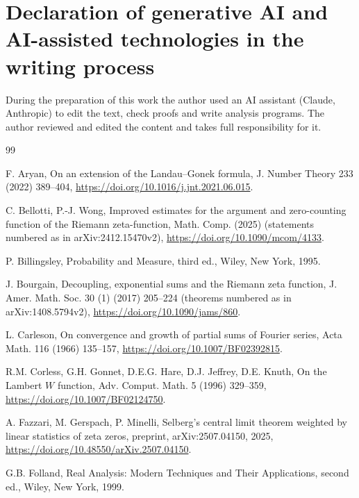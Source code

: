 \documentclass[preprint,12pt]{elsarticle}
\numberwithin{equation}{section}
\theoremstyle{plain}
\theoremstyle{definition}
\theoremstyle{remark}
\begin{document}
\section*{Declaration of generative AI and AI-assisted technologies in the writing process}
During the preparation of this work the author used an AI assistant (Claude, Anthropic) to edit the text, check proofs and write analysis programs. The author reviewed and edited the content and takes full responsibility for it.

\begin{thebibliography}{99}

F. Aryan, On an extension of the Landau--Gonek formula, J. Number Theory 233 (2022) 389--404, \href{https://doi.org/10.1016/j.jnt.2021.06.015}{https://doi.org/10.1016/j.jnt.2021.06.015}.

C. Bellotti, P.-J. Wong, Improved estimates for the argument and zero-counting function of the Riemann zeta-function, Math. Comp. (2025) (statements numbered as in arXiv:2412.15470v2), \href{https://doi.org/10.1090/mcom/4133}{https://doi.org/10.1090/mcom/4133}.

P. Billingsley, Probability and Measure, third ed., Wiley, New York, 1995.

J. Bourgain, Decoupling, exponential sums and the Riemann zeta function, J. Amer. Math. Soc. 30 (1) (2017) 205--224 (theorems numbered as in arXiv:1408.5794v2), \href{https://doi.org/10.1090/jams/860}{https://doi.org/10.1090/jams/860}.

L. Carleson, On convergence and growth of partial sums of Fourier series, Acta Math. 116 (1966) 135--157, \href{https://doi.org/10.1007/BF02392815}{https://doi.org/10.1007/BF02392815}.

R.M. Corless, G.H. Gonnet, D.E.G. Hare, D.J. Jeffrey, D.E. Knuth, On the Lambert $W$ function, Adv. Comput. Math. 5 (1996) 329--359, \href{https://doi.org/10.1007/BF02124750}{https://doi.org/10.1007/BF02124750}.

A. Fazzari, M. Gerspach, P. Minelli, Selberg's central limit theorem weighted by linear statistics of zeta zeros, preprint, arXiv:2507.04150, 2025, \href{https://doi.org/10.48550/arXiv.2507.04150}{https://doi.org/10.48550/arXiv.2507.04150}.

G.B. Folland, Real Analysis: Modern Techniques and Their Applications, second ed., Wiley, New York, 1999.


\end{thebibliography}
\end{document}
